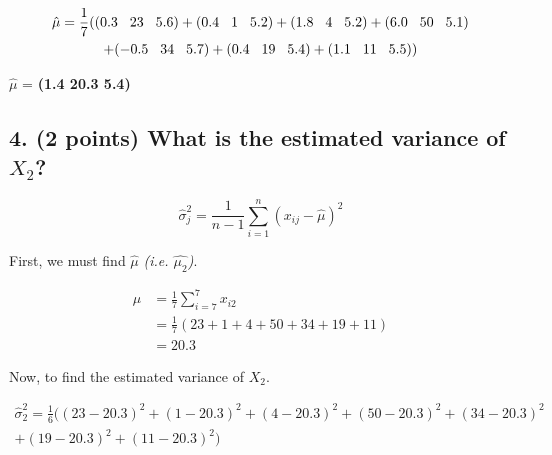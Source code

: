 \documentclass[11pt]{article}
\begin{document}
\begin{multline*}
    \hat{\mu} = \frac{1}{7} ( 
        (0.3 \hspace{.3cm} 23 \hspace{.3cm} 5.6)
        + (0.4 \hspace{.3cm} 1 \hspace{.3cm} 5.2)
        + (1.8 \hspace{.3cm} 4 \hspace{.3cm} 5.2)
        + (6.0 \hspace{.3cm} 50 \hspace{.3cm} 5.1) \\
        + (-0.5 \hspace{.3cm} 34 \hspace{.3cm} 5.7)
        + (0.4 \hspace{.3cm} 19 \hspace{.3cm} 5.4)
        + (1.1 \hspace{.3cm} 11 \hspace{.3cm} 5.5) )
\end{multline*}

\begin{tcolorbox}[title=Problem 2.3]
    $\hat{\mu}$ = \textbf{(1.4 \hspace{.2cm} 20.3 \hspace{.2cm} 5.4)}
\end{tcolorbox}

\subsection*{\textbf{4. (2 points)} What is the estimated variance of $X_2$?}

$$\hat{\sigma}^{2}_{j} = \frac{1}{n-1}\sum_{i=1}^{n} (x_{ij} - \hat{\mu})^{2}$$

First, we must find $\hat{\mu}$ \textit{(i.e. $\hat{\mu_2}$)}.

\begin{align*}
    \hat{\mu} & = \frac{1}{7} \sum_{i=7}^{7} x_{i2} \\
    & = \frac{1}{7}(23 + 1 + 4 + 50 + 34 + 19 + 11) \\
    & = 20.3
\end{align*}

Now, to find the estimated variance of $X_2$.

\begin{multline*}
    \hat{\sigma}^{2}_{2} = \frac{1}{6}( 
        (23 - 20.3)^2
        + (1 - 20.3)^2
        + (4 - 20.3)^2
        + (50 - 20.3)^2
        + (34 - 20.3)^2 \\
        + (19 - 20.3)^2
        + (11 - 20.3)^2
        )
\end{multline*}
\end{document}
